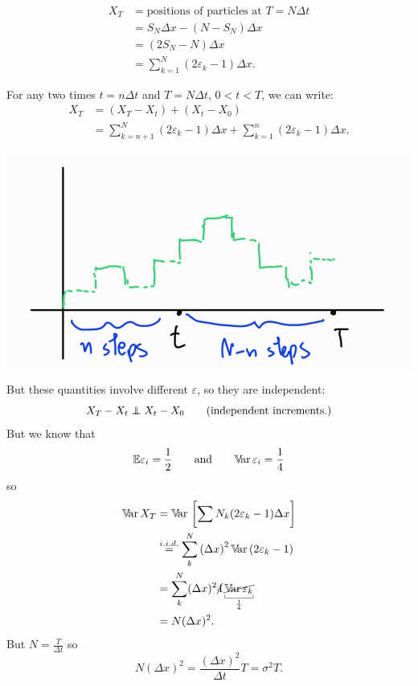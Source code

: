 \documentclass{report}
\begin{document}
\begin{align*}
	X_{T}&=\text{positions of particles at }T=N\Delta t\\
	&=S_{N}\Delta x-(N-S_{N})\Delta x\\
	&=(2S_{N}-N)\Delta x\\
	&=\sum_{k=1}^{N}(2\varepsilon_{k}-1)\Delta x.
\end{align*}
\begin{remark}
	For any two times $t=n\Delta t$ and $T=N\Delta t$, $0<t<T$, we can write:
	\begin{align*}
		X_{T}&=(X_{T}-X_{t})+(X_{t}-X_{0})\\
		&=\sum_{k=n+1}^{N}(2\varepsilon_{k}-1)\Delta x+\sum_{k=1}^{n}(2\varepsilon_{k}-1)\Delta x.
	\end{align*}
		\begin{center}
			\includegraphics[width=0.5\linewidth]{img/screenshot010}
		\end{center}
	But these quantities involve different $\varepsilon$, so they are independent:
	\begin{equation*}
		X_{T}-X_{t}\independent X_{t}-X_{0}\qquad\text{(independent increments.)}
	\end{equation*}
	But we know that 
	\begin{equation*}
		\mathbb{E}\varepsilon_{i}=\frac{1}{2}\qquad\mathrm{and}\qquad\mathbb{V}\!\mathrm{ar}\,\varepsilon_{i}=\frac{1}{4}
	\end{equation*}
	so
	\begin{align*}
		\var X_{T}&=\var\left[\sum^{}{N}_{k}(2\varepsilon_{k}-1)\Delta x\right]\\
		&\overset{i.i.d.}{=}\sum^{N}_{k}\left(\Delta x\right)^{2}\var(2\varepsilon_{k}-1)\\
		&=\sum_{k}^{N}(\Delta x)^{2}\cancel{4}\ubracketthin{\cancel{\var \varepsilon_{k}}}_{\frac{1}{4}}\\
		&=N(\Delta x)^{2}.
	\end{align*}
	But $N=\frac{T}{\Delta t}$ so 
	\begin{equation*}
		N(\Delta x)^{2}=\frac{(\Delta x)^{2}}{\Delta t}T=\sigma^{2}T.
	\end{equation*}
\end{remark}
\end{document}
